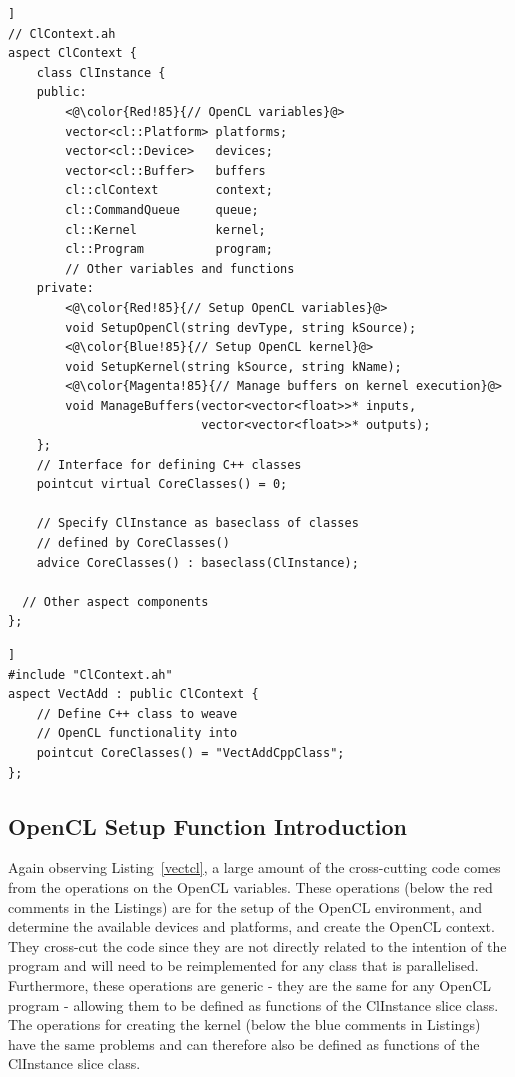 \documentclass{sig-alternate-05-2015}
\begin{document}
\begin{lstlisting}[caption=Abstract ClContext aspect which defines the OpenCL variables
required for parallel programming.,label=slice,float=[!t]]
// ClContext.ah
aspect ClContext {
	class ClInstance {
	public:
		<@\color{Red!85}{// OpenCL variables}@>
		vector<cl::Platform> platforms;
		vector<cl::Device>   devices;
		vector<cl::Buffer>   buffers
		cl::clContext        context;
		cl::CommandQueue     queue;
		cl::Kernel           kernel;
		cl::Program          program;
		// Other variables and functions 
	private:
		<@\color{Red!85}{// Setup OpenCL variables}@>
		void SetupOpenCl(string devType, string kSource);
		<@\color{Blue!85}{// Setup OpenCL kernel}@>
		void SetupKernel(string kSource, string kName);
		<@\color{Magenta!85}{// Manage buffers on kernel execution}@>
		void ManageBuffers(vector<vector<float>>* inputs,
		                   vector<vector<float>>* outputs);
	};
	// Interface for defining C++ classes
	pointcut virtual CoreClasses() = 0;

	// Specify ClInstance as baseclass of classes
	// defined by CoreClasses()
	advice CoreClasses() : baseclass(ClInstance);

  // Other aspect components
};
\end{lstlisting}

\begin{lstlisting}[caption=Derived aspect defining a \CPP class into which the OpenCL 
	functionality should be woven.,label=dslice,float=[!t]]
#include "ClContext.ah"
aspect VectAdd : public ClContext {
	// Define C++ class to weave
	// OpenCL functionality into
	pointcut CoreClasses() = "VectAddCppClass";
};
\end{lstlisting}

\subsection{OpenCL Setup Function Introduction}

Again observing Listing~\ref{vectcl}, a large amount of the cross-cutting code
comes from the operations on the OpenCL variables. These operations (below the
red comments in the Listings) are for the setup of the OpenCL environment, and 
determine the available devices and platforms, and create the OpenCL context. They
cross-cut the \CPP code since they are not directly related to the intention of the
program and will need to be reimplemented for any class that is parallelised. Furthermore, 
these operations are generic - they are the same for any 
OpenCL program - allowing them to be defined as functions of the ClInstance
slice class. The operations for creating the kernel (below the blue 
comments in Listings) have the same problems and can therefore also be defined
as functions of the ClInstance slice class. 
\end{document}
